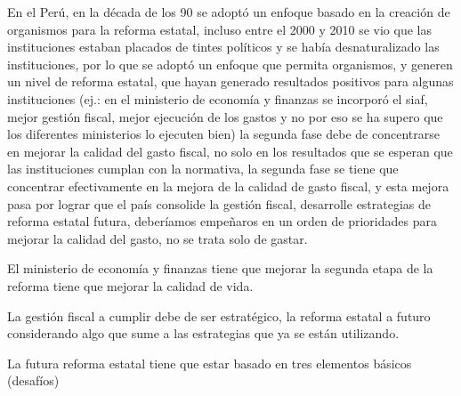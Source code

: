 \documentclass[
  jou,
  floatsintext,
  longtable,
  a4paper,
  nolmodern,
  notxfonts,
  notimes,
  12pt,
  colorlinks=true,linkcolor=blue,citecolor=blue,urlcolor=blue]{apa7}
\begin{document}
En el Perú, en la década de los 90 se adoptó un enfoque basado en la
creación de organismos para la reforma estatal, incluso entre el 2000 y
2010 se vio que las instituciones estaban placados de tintes políticos y
se había desnaturalizado las instituciones, por lo que se adoptó un
enfoque que permita organismos, y generen un nivel de reforma estatal,
que hayan generado resultados positivos para algunas instituciones (ej.:
en el ministerio de economía y finanzas se incorporó el siaf, mejor
gestión fiscal, mejor ejecución de los gastos y no por eso se ha supero
que los diferentes ministerios lo ejecuten bien) la segunda fase debe de
concentrarse en mejorar la calidad del gasto fiscal, no solo en los
resultados que se esperan que las instituciones cumplan con la
normativa, la segunda fase se tiene que concentrar efectivamente en la
mejora de la calidad de gasto fiscal, y esta mejora pasa por lograr que
el país consolide la gestión fiscal, desarrolle estrategias de reforma
estatal futura, deberíamos empeñaros en un orden de prioridades para
mejorar la calidad del gasto, no se trata solo de gastar.

El ministerio de economía y finanzas tiene que mejorar la segunda etapa
de la reforma tiene que mejorar la calidad de vida.

La gestión fiscal a cumplir debe de ser estratégico, la reforma estatal
a futuro considerando algo que sume a las estrategias que ya se están
utilizando.

La futura reforma estatal tiene que estar basado en tres elementos
básicos (desafíos)
\end{document}
